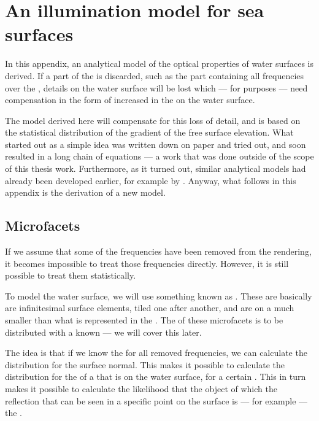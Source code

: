 \chapter{An illumination model for sea surfaces}
\label{apdx:illumination_model_derivation}

In this appendix, an analytical model of the optical properties of water surfaces is derived. If a part of the  is discarded, such as the part containing all frequencies over the , details on the water surface will be lost which --- for \visualization purposes --- need compensation in the form of increased  in the  on the water surface.

The model derived here will compensate for this loss of detail, and is based on the statistical distribution of the gradient of the free surface elevation. What started out as a simple idea was written down on paper and tried out, and soon resulted in a long chain of equations --- a work that was done outside of the scope of this thesis work. Furthermore, as it turned out, similar analytical models had already been developed earlier, for example by \citet{Caillault2007}. Anyway, what follows in this appendix is the derivation of a new model.

\section{Microfacets}

If we assume that some of the frequencies have been removed from the rendering, it becomes impossible to treat those frequencies directly. However, it is still possible to treat them statistically.

To model the water surface, we will use something known as \microfacets. These are basically are infinitesimal surface elements, tiled one after another, and are on a much smaller \scale than what is represented in the \rendering. The  of these microfacets is \assumed to be \stochastically distributed with a known  --- we will cover this later.

The idea is that if we know the  for all removed frequencies, we can calculate the distribution for the surface normal. This makes it possible to calculate the distribution for the  of a \ray that is  on the water surface, for a certain . This in turn makes it possible to calculate the likelihood that the object of which the reflection that can be seen in a specific point on the surface is --- for example --- the \sun.

